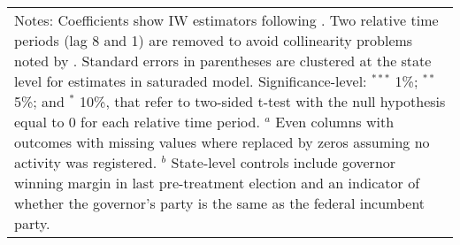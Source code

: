 \begin{landscape}
\begin{table}[htbp]
{\begin{tabular}{lcccccc}
\hline \hline
\multicolumn{7}{p{1.2\textwidth}}{\footnotesize{Notes: Coefficients show IW estimators following \citet{abraham_sun_2020}. Two relative time periods (lag 8 and 1) are removed to avoid collinearity problems noted by \citet{abraham_sun_2020}. Standard errors in parentheses are clustered at the state level for estimates in saturaded model. Significance-level: $^{***}$ 1\%; $^{**}$ 5\%; and $^*$ 10\%, that refer to two-sided t-test with the null hypothesis equal to 0 for each relative time period. $^a$ Even columns with outcomes with missing values where replaced by zeros assuming no activity was registered. $^b$ State-level controls include governor winning margin in last pre-treatment election and an indicator of whether the governor's party is the same as the federal incumbent party.}} \\
\end{tabular}
}
\end{table}
\end{landscape}
